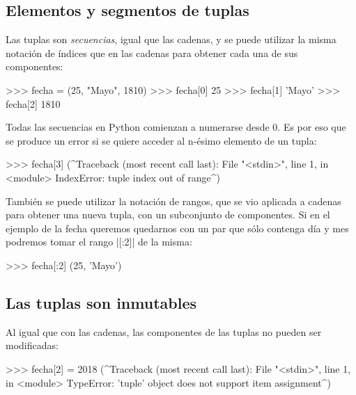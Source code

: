 \subsection{Elementos y segmentos de tuplas}

Las tuplas son \emph{secuencias}, igual que las cadenas, y se puede utilizar la
misma notación de índices que en las cadenas para obtener cada una de sus
componentes:
\begin{codigo-python-sn}
>>> fecha = (25, "Mayo", 1810)
>>> fecha[0]
25
>>> fecha[1]
'Mayo'
>>> fecha[2]
1810
\end{codigo-python-sn}

\begin{atencion}
Todas las secuencias en Python comienzan a numerarse desde 0.  Es por eso
que se produce un error si se quiere acceder al n-ésimo elemento de un
tupla:
\begin{codigo-python-sn}
>>> fecha[3]
(^Traceback (most recent call last):
  File "<stdin>", line 1, in <module>
IndexError: tuple index out of range^)
\end{codigo-python-sn}
\end{atencion}

También se puede utilizar la notación de rangos, que se vio aplicada a
cadenas para obtener una nueva tupla, con un subconjunto de componentes. Si
en el ejemplo de la fecha queremos quedarnos con un par que sólo contenga
día y mes podremos tomar el rango |[:2]| de la misma:

\begin{codigo-python-sn}
>>> fecha[:2]
(25, 'Mayo')
\end{codigo-python-sn}


\subsection{Las tuplas son inmutables}

Al igual que con las cadenas, las componentes de las tuplas no pueden ser
modificadas:

\begin{codigo-python-sn}
>>> fecha[2] = 2018
(^Traceback (most recent call last):
  File "<stdin>", line 1, in <module>
TypeError: 'tuple' object does not support item assignment^)
\end{codigo-python-sn}

